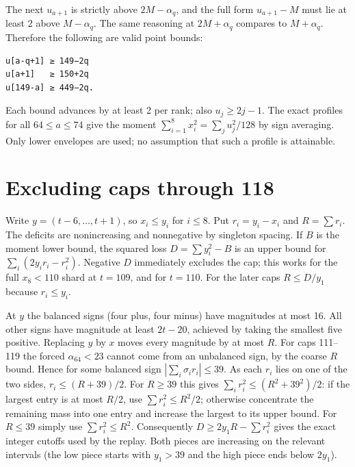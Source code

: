 \documentclass[11pt,letterpaper]{article}
\begin{document}
The next \(u_{a+1}\) is strictly above \(2M-\alpha_q\), and the full
form \(u_{a+1}-M\) must lie at least 2 above \(M-\alpha_q\). The same
reasoning at \(2M+\alpha_q\) compares to \(M+\alpha_q\). Therefore the
following are valid point bounds:

\begin{verbatim}
u[a-q+1] ≥ 149−2q
u[a+1]   ≥ 150+2q
u[149-a] ≥ 449−2q.
\end{verbatim}

Each bound advances by at least 2 per rank; also \(u_j\ge2j-1\). The
exact profiles for all \(64\le a\le74\) give the moment
\(\sum_{i=1}^8 x_i^2=\sum_j u_j^2/128\) by sign averaging. Only lower
envelopes are used; no assumption that such a profile is attainable.

\section{Excluding caps through 118}\label{excluding-caps-through-118}

Write \(y=(t-6,\ldots,t+1)\), so \(x_i\le y_i\) for \(i\le8\). Put
\(r_i=y_i-x_i\) and \(R=\sum r_i\). The deficits are nonincreasing and
nonnegative by singleton spacing. If \(B\) is the moment lower bound,
the squared loss \(D=\sum y_i^2-B\) is an upper bound for
\(\sum_i (2y_i r_i-r_i^2)\). Negative \(D\) immediately excludes the
cap; this works for the full \(x_8<110\) shard at \(t=109\), and for
\(t=110\). For the later caps \(R\le D/y_1\) because \(r_i\le y_i\).

At \(y\) the balanced signs (four plus, four minus) have magnitudes at
most 16. All other signs have magnitude at least \(2t-20\), achieved by
taking the smallest five positive. Replacing \(y\) by \(x\) moves every
magnitude by at most \(R\). For caps 111--119 the forced
\(\alpha_{64}<23\) cannot come from an unbalanced sign, by the coarse
\(R\) bound. Hence for some balanced sign
\(|\sum_i \sigma_i r_i|\le39\). As each \(r_i\) lies on one of the two
sides, \(r_i\le (R+39)/2\). For \(R\ge39\) this gives
\(\sum_i r_i^2\le (R^2+39^2)/2\): if the largest entry is at most
\(R/2\), use \(\sum r_i^2\le R^2/2\); otherwise concentrate the
remaining mass into one entry and increase the largest to its upper
bound. For \(R\le39\) simply use \(\sum r_i^2\le R^2\). Consequently
\(D\ge 2y_1R-\sum r_i^2\) gives the exact integer cutoffs used by the
replay. Both pieces are increasing on the relevant intervals (the low
piece starts with \(y_1>39\) and the high piece ends below \(2y_1\)).
\end{document}
